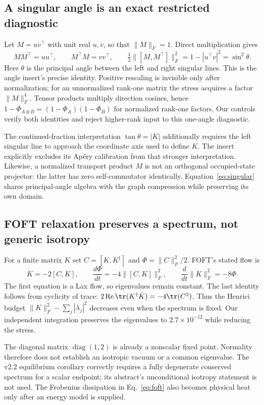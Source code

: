 \subsection{A singular angle is an exact restricted diagnostic}
Let $M=uv^\top$ with unit real $u,v$, so that $\|M\|_F=1$. Direct multiplication gives
\begin{equation}
MM^\top=uu^\top,\qquad M^\top M=vv^\top,\qquad
\tfrac12\|[M,M^\top]\|_F^2=1-|u^\top v|^2=\sin^2\theta.
\label{eq:singular}
\end{equation}
Here $\theta$ is the principal angle between the left and right singular lines. This is the angle insert's precise identity. Positive rescaling is invisible only after normalization; for an unnormalized rank-one matrix the stress acquires a factor $\|M\|_F^4$. Tensor products multiply direction cosines, hence $1-\Phi_{A\otimes B}=(1-\Phi_A)(1-\Phi_B)$ for normalized rank-one factors. Our controls verify both identities and reject higher-rank input to this one-angle diagnostic.

The continued-fraction interpretation $\tan\theta=|K|$ additionally requires the left singular line to approach the coordinate axis used to define $K$. The insert explicitly excludes its Ap\'ery calibration from that stronger interpretation. Likewise, a normalized transport product $M$ is not an orthogonal occupied-state projector: the latter has zero self-commutator identically. Equation~\eqref{eq:singular} shares principal-angle algebra with the graph compression while preserving its own domain.

\subsection{FOFT relaxation preserves a spectrum, not generic isotropy}
For a finite matrix $K$ set $C=[K,K^\dagger]$ and $\Phi=\|C\|_F^2/2$. FOFT's stated flow is
\begin{equation}
\dot K=-2[C,K],\qquad
\frac{d\Phi}{dt}=-4\|[C,K]\|_F^2,\qquad
\frac{d}{dt}\|K\|_F^2=-8\Phi.
\label{eq:foft}
\end{equation}
The first equation is a Lax flow, so eigenvalues remain constant. The last identity follows from cyclicity of trace: $2\operatorname{Re}\tr(K^\dagger\dot K)=-4\tr(C^2)$. Thus the Henrici budget $\|K\|_F^2-\sum_j|\lambda_j|^2$ decreases even when the spectrum is fixed. Our independent integration preserves the eigenvalues to $2.7\times10^{-12}$ while reducing the stress.

The diagonal matrix $\operatorname{diag}(1,2)$ is already a nonscalar fixed point. Normality therefore does not establish an isotropic vacuum or a common eigenvalue. The v2.2 equilibrium corollary correctly requires a fully degenerate conserved spectrum for a scalar endpoint; its abstract's unconditional isotropy statement is not used. The Frobenius dissipation in Eq.~\eqref{eq:foft} also becomes physical heat only after an energy model is supplied.

